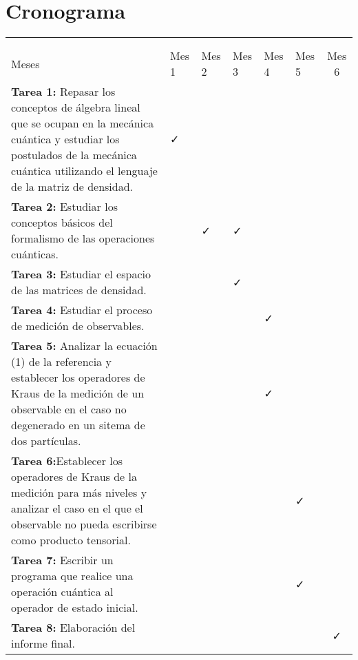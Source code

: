 \section{Cronograma}


\begin{table}[H]
	\begin{center}
		
	\begin{tabular}{|>{\arraybackslash}m{6cm}|>{\centering}m{1cm}|>{\centering}m{1cm}|>{\centering}m{1cm}|>{\centering}m{1cm}|>{\centering}m{1cm}|c|}
		\hline
		
		\diagbox[width=18em]{  Tareas\\ }{ \\ Meses}&
		 Mes 1& Mes 2&Mes 3&Mes 4 &Mes 5&Mes 6 \\ \hline \hline
		\textbf{Tarea 1:} Repasar los conceptos de álgebra lineal que se ocupan en la mecánica cuántica y estudiar los postulados de la mecánica cuántica utilizando el lenguaje de la matriz de densidad.&\faCheck & & & & & \\ \hline
		\textbf{Tarea 2:} Estudiar los conceptos básicos del formalismo de las operaciones cuánticas.&&\faCheck&\faCheck&&& \\ \hline
		\textbf{Tarea 3:} Estudiar el espacio de las matrices de densidad.&&&\faCheck&&&\\ \hline
		\textbf{Tarea 4:} Estudiar el proceso de medición de observables. &                          & &  & \faCheck &  &                          \\ \hline
		\textbf{Tarea 5:} Analizar la ecuación (1) de la referencia \cite{Pineda_2021} y establecer los operadores de Kraus de la medición de un observable en el caso no degenerado en un sitema de dos partículas. &                          &  & &\faCheck   &  &                          \\ \hline
		\textbf{Tarea 6:}Establecer los operadores de Kraus de la medición para más niveles y analizar el caso en el que el observable no pueda escribirse como producto tensorial.&                          &                          &  & &\faCheck   &                          \\ \hline
		\textbf{Tarea 7:} Escribir un programa que realice una operación cuántica al operador de estado inicial. &                          &                          &  &  & \faCheck &                          \\ \hline
		\textbf{Tarea 8:} Elaboración del informe final.&                          &                          &  &  &  &\faCheck  \\ \hline
	\end{tabular}

	\end{center}

\end{table}